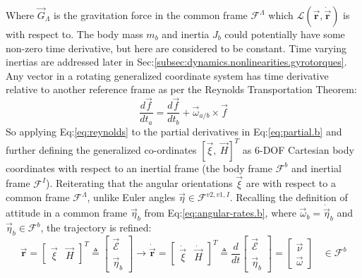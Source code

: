 Where $\vec{G}_\Lambda$ is the gravitation force in the common frame $\mathcal{F}^\Lambda$ which $\mathcal{L}(\vec{\mathbf{r}},\dot{\vec{\mathbf{r}}})$ is with respect to. The body mass $m_b$ and inertia $J_b$ could potentially have some non-zero time derivative, but here are considered to be constant. Time varying inertias are addressed later in Sec:\ref{subsec:dynamics.nonlinearities.gyrotorques}. Any vector in a rotating generalized coordinate system has time derivative relative to another reference frame as per the Reynolds Transportation Theorem\cite{reynolds}:
\begin{equation}\label{eq:reynolds}
\frac{d\vec{f}}{dt_a}=\frac{d\vec{f}}{dt_b}+\vec{\omega}_{a/b}\times\vec{f}
\end{equation}
So applying Eq:\ref{eq:reynolds} to the partial derivatives in Eq:\ref{eq:partial.b} and further defining the generalized co-ordinates $[\vec{\xi},~\vec{H}]^T$ as 6-DOF Cartesian body coordinates with respect to an inertial frame (the body frame $\mathcal{F}^b$ and inertial frame $\mathcal{F}^I$). Reiterating that the angular orientations $\vec{\xi}$ are with respect to a common frame $\mathcal{F}^{\Lambda}$, unlike Euler angles $\vec{\eta}\in\mathcal{F}^{v2,v1,I}$. Recalling the definition of attitude in a common frame $\vec{\eta}_b$ from Eq:\ref{eq:angular-rates.b}, where $\vec{\omega}_b=\dot{\vec{\eta}}_b$ and $\vec{\eta}_b\in\mathcal{F}^{b}$, the trajectory is refined: 
\begin{equation}
\vec{\mathbf{r}}=\begin{bmatrix}
\vec{\xi}&
\vec{H}
\end{bmatrix}^T
\triangleq
\begin{bmatrix}
\vec{\mathcal{E}}_{\hspace{3pt}}\\
\vec{\eta}_{b}
\end{bmatrix}
\rightarrow
\dot{\vec{\mathbf{r}}}=
\begin{bmatrix}
\dot{\vec{\xi}} & \dot{\vec{H}}
\end{bmatrix}^T
\triangleq
\frac{d}{dt}
\begin{bmatrix}
{\vec{\mathcal{E}}}_{\hspace{3pt}}\\
\vec{\eta}_b
\end{bmatrix}
=
\begin{bmatrix}
\vec{\nu}\\
\vec{\omega}
\end{bmatrix}~~~~
\in \mathcal{F}^b
\end{equation}
